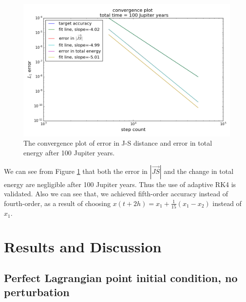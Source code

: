 \documentclass[12pt,a4paper]{article}
\begin{document}
\begin{figure}[H]
\centering
\includegraphics[width=6in]{figure_6_100v_100orbits.png} 
\caption{The convergence plot of error in J-S distance and error in total energy after 100 Jupiter years.}
\label{fig:convergence}
\end{figure}
	
We can see from Figure \ref{fig:convergence} that both the error in $|\overrightarrow{JS}|$ and the change in total energy are negligible after 100 Jupiter years. Thus the use of adaptive RK4 is validated. Also we can see that, we achieved fifth-order accuracy instead of fourth-order, as a result of choosing $x(t+2h) = x_1 + \frac{1}{15}(x_1-x_2)$ instead of $x_1$.


\section{Results and Discussion}

\subsection{Perfect Lagrangian point initial condition, no perturbation}
\end{document}
